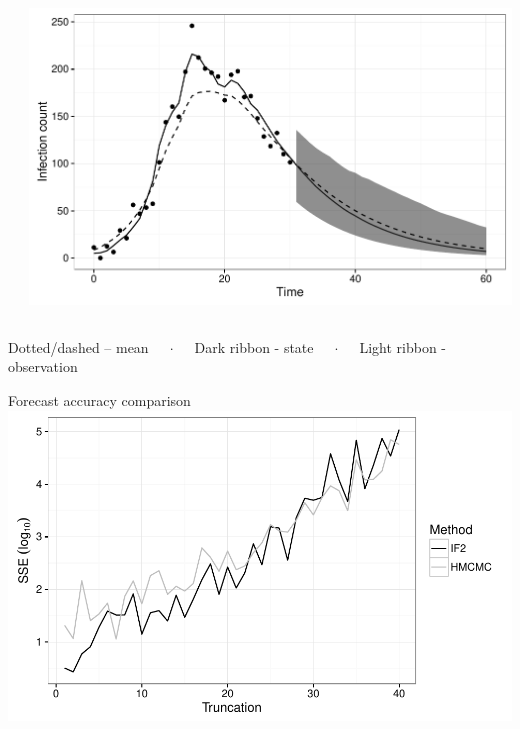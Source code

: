 \documentclass[12pt]{beamer}
\begin{document}
\begin{frame}
\begin{columns}
\begin{column}{0.25\textwidth}
		\end{column}
		\begin{column}{0.65\textwidth}

			\includegraphics[width=\textwidth,height=0.45\textheight,keepaspectratio=true]{../../writing/SC2/images/hmcforecast}

		\end{column}
	\end{columns}

	\vspace{0.5\baselineskip}
	\tiny
	\centering
	Dotted/dashed -- mean $\quad\cdot\quad$ Dark ribbon - state $\quad\cdot\quad$ Light ribbon - observation

\end{frame}


\begin{frame}

	\null
	\large
	Forecast accuracy comparison \\
	\vspace{\baselineskip}
	\includegraphics[width=\textwidth,height=\textheight,keepaspectratio=true]{../../writing/SC2/images/truncation}

\end{frame}
\end{document}
